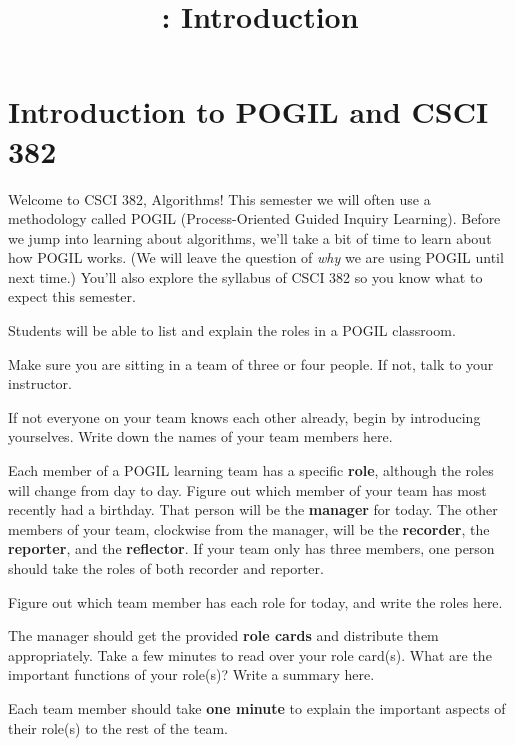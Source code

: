 \documentclass{tufte-handout}
\title{\thecourse: Introduction}
\date{}
\begin{document}
\maketitle

\section{Introduction to POGIL and CSCI 382}

Welcome to CSCI 382, Algorithms!  This semester we will often use a
methodology called POGIL (Process-Oriented Guided Inquiry
Learning). Before we jump into
learning about algorithms, we'll take a bit of time to learn about how
POGIL works. (We will leave the question of \emph{why} we are using
POGIL until next time.)  You'll also explore the syllabus of CSCI 382
so you know what to expect this semester.

\begin{objective}
  Students will be able to list and explain the roles in a POGIL
  classroom.
\end{objective}

Make sure you are sitting in a team of three or four people.  If not,
talk to your instructor.

\begin{questions}
\item If not everyone on your team knows each other already, begin by
  introducing yourselves.  Write down the names of your team members
  here.
\end{questions}

Each member of a POGIL learning team has a specific \textbf{role},
although the roles will change from day to day.  Figure out which
member of your team has most recently had a birthday.  That person
will be the \textbf{manager} for today. The other members of your
team, clockwise from the manager, will be the \textbf{recorder}, the
\textbf{reporter}, and the \textbf{reflector}.  If your team only has
three members, one person should take the roles of both recorder and
reporter.

\begin{questions}
\item Figure out which team member has each role for today, and write
  the roles here.
\item The manager should get the provided \textbf{role cards} and
  distribute them appropriately.  Take a few minutes to read over your
  role card(s).  What are the important functions of your role(s)?
  Write a summary here.
\item Each team member should take \textbf{one minute} to explain the
  important aspects of their role(s) to the rest of the team.
\end{questions}
\end{document}
